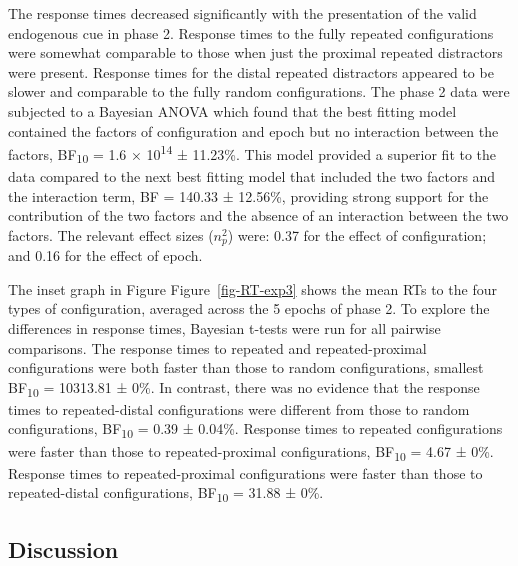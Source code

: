 \documentclass[
  man,
  floatsintext,
  longtable,
  nolmodern,
  notxfonts,
  notimes,
  colorlinks=true,linkcolor=blue,citecolor=blue,urlcolor=blue]{apa7}
\begin{document}
The response times decreased significantly with the presentation of the
valid endogenous cue in phase 2. Response times to the fully repeated
configurations were somewhat comparable to those when just the proximal
repeated distractors were present. Response times for the distal
repeated distractors appeared to be slower and comparable to the fully
random configurations. The phase 2 data were subjected to a Bayesian
ANOVA which found that the best fitting model contained the factors of
configuration and epoch but no interaction between the factors,
BF\textsubscript{10} = 1.6 × 10\textsuperscript{14} ± 11.23\%. This
model provided a superior fit to the data compared to the next best
fitting model that included the two factors and the interaction term, BF
= 140.33 ± 12.56\%, providing strong support for the contribution of the
two factors and the absence of an interaction between the two factors.
The relevant effect sizes (\(n^2_p\)) were: 0.37 for the effect of
configuration; and 0.16 for the effect of epoch.

The inset graph in Figure Figure~\ref{fig-RT-exp3} shows the mean RTs to
the four types of configuration, averaged across the 5 epochs of phase
2. To explore the differences in response times, Bayesian t-tests were
run for all pairwise comparisons. The response times to repeated and
repeated-proximal configurations were both faster than those to random
configurations, smallest BF\textsubscript{10} = 10313.81 ± 0\%. In
contrast, there was no evidence that the response times to
repeated-distal configurations were different from those to random
configurations, BF\textsubscript{10} = 0.39 ± 0.04\%. Response times to
repeated configurations were faster than those to repeated-proximal
configurations, BF\textsubscript{10} = 4.67 ± 0\%. Response times to
repeated-proximal configurations were faster than those to
repeated-distal configurations, BF\textsubscript{10} = 31.88 ± 0\%.

\subsection{Discussion}\label{discussion-2}
\end{document}
